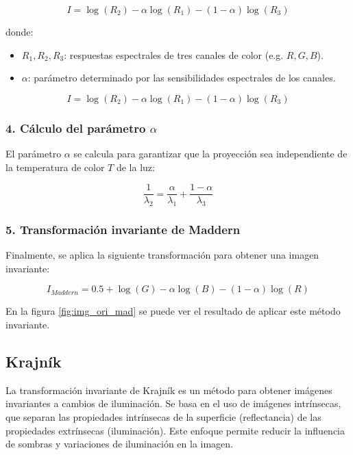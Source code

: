 $$I=\log (R_2 )-\alpha \log (R_1 )-(1-\alpha )\log (R_3 )$$

donde:

\begin{itemize}
\setlength{\itemsep}{-1ex}
   \item{\begin{flushleft} $R_1 ,R_2 ,R_3$: respuestas espectrales de tres canales de color (e.g. $R,G,B$). \end{flushleft}}
   \item{\begin{flushleft} $\alpha$: parámetro determinado por las sensibilidades espectrales de los canales. \end{flushleft}}
\end{itemize}

$$I=\log (R_2 )-\alpha \log (R_1 )-(1-\alpha )\log (R_3 )$$

\subsubsection{4. Cálculo del parámetro $\alpha$}

El parámetro $\alpha$ se calcula para garantizar que la proyección sea independiente de la temperatura de color $T$ de la luz:

$$\frac{1}{\lambda_2 }=\frac{\alpha }{\lambda_1 }+\frac{1-\alpha }{\lambda_3 }$$

\subsubsection{5. Transformación invariante de Maddern}

Finalmente, se aplica la siguiente transformación para obtener una imagen invariante:

$$I_{Maddern} =0.5+\log (G)-\alpha \log (B)-(1-\alpha )\log (R)$$

En la figura \ref{fig:img_ori_mad} se puede ver el resultado de aplicar este método invariante.

\subsection{Krajník}\label{krajník}

La transformación invariante de Krajník \cite{krajník2015} es un método para obtener imágenes invariantes a cambios de iluminación. Se basa en el uso de imágenes intrínsecas, que separan las propiedades intrínsecas de la superficie (reflectancia) de las propiedades extrínsecas (iluminación). Este enfoque permite reducir la influencia de sombras y variaciones de iluminación en la imagen.

